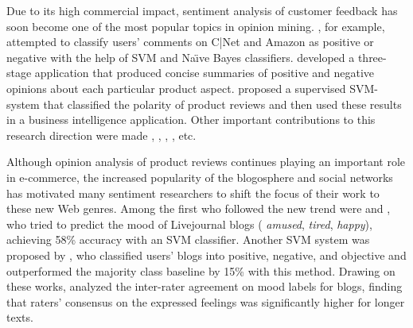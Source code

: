 
Due to its high commercial impact, sentiment analysis of customer
feedback has soon become one of the most popular topics in opinion
mining.  \citet{Dave:03}, for example, attempted to classify users'
comments on C|Net and Amazon as positive or negative with the help of
SVM and Na\"{\i}ve Bayes classifiers.  \citet{Hu:04} developed a
three-stage application that produced concise summaries of positive
and negative opinions about each particular product aspect.
\citet{Funk:08} proposed a supervised SVM-system that classified the
polarity of product reviews and then used these results in a business
intelligence application.  Other important contributions to this
research direction were made \citet{Popescu:05}, \citet{Ding:09},
\citet{Wei:10}, \citet{Mukherjee:12}, etc.


Although opinion analysis of product reviews continues playing an
important role in e-commerce, the increased popularity of the
blogosphere and social networks has motivated many sentiment
researchers to shift the focus of their work to these new Web genres.
Among the first who followed the new trend were \citet{Mishne:05} and
\citet{Mishne:07}, who tried to predict the mood of Livejournal blogs
(\eg{} \emph{amused}, \emph{tired}, \emph{happy}), achieving 58\%
accuracy with an SVM classifier.
Another SVM system was proposed by \citet{Chesley:06}, who classified
users' blogs into positive, negative, and objective and outperformed
the majority class baseline by 15\% with this method.  Drawing on
these works, \citet{Gill:08} analyzed the inter-rater agreement on
mood labels for blogs, finding that raters' consensus on the expressed
feelings was significantly higher for longer texts.

